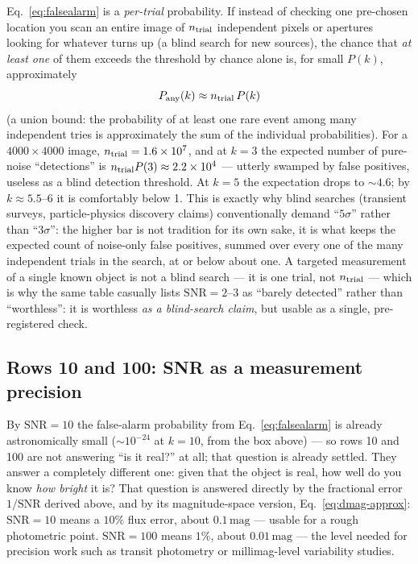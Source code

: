 \documentclass[11pt]{article}
\begin{document}
\begin{tcolorbox}[flagbox, title=THE CATCH: FALSE ALARMS MULTIPLY WITH THE NUMBER OF TRIES]
Eq.~\ref{eq:falsealarm} is a \emph{per-trial} probability. If instead of checking one pre-chosen
location you scan an entire image of $n_{\rm trial}$ independent pixels or apertures looking for
whatever turns up (a blind search for new sources), the chance that \emph{at least one} of them
exceeds the threshold by chance alone is, for small $P(k)$, approximately
\begin{equation}
P_{\rm any}(k) \approx n_{\rm trial}\,P(k)
\end{equation}
(a union bound: the probability of at least one rare event among many independent tries is
approximately the sum of the individual probabilities). For a $4000\times4000$ image,
$n_{\rm trial}=1.6\times10^7$, and at $k=3$ the expected number of pure-noise ``detections'' is
$n_{\rm trial}P(3)\approx 2.2\times10^4$ --- utterly swamped by false positives, useless as a blind
detection threshold. At $k=5$ the expectation drops to $\sim4.6$; by $k\approx5.5$--6 it is comfortably
below 1. This is exactly why blind searches (transient surveys, particle-physics discovery claims)
conventionally demand ``$5\sigma$'' rather than ``$3\sigma$'': the higher bar is not tradition for its
own sake, it is what keeps the expected count of noise-only false positives, summed over every one of
the many independent trials in the search, at or below about one. A targeted measurement of a single
known object is not a blind search --- it is one trial, not $n_{\rm trial}$ --- which is why the same
table casually lists $\mathrm{SNR}=2$--3 as ``barely detected'' rather than ``worthless'': it is
worthless \emph{as a blind-search claim}, but usable as a single, pre-registered check.
\end{tcolorbox}

\subsection*{Rows 10 and 100: SNR as a measurement precision}

By $\mathrm{SNR}=10$ the false-alarm probability from Eq.~\ref{eq:falsealarm} is already
astronomically small ($\sim10^{-24}$ at $k=10$, from the box above) --- so rows 10 and 100 are not
answering ``is it real?'' at all; that question is already settled. They answer a completely different
one: given that the object is real, how well do you know \emph{how bright} it is? That question is
answered directly by the fractional error $1/\mathrm{SNR}$ derived above, and by its magnitude-space
version, Eq.~\ref{eq:dmag-approx}: $\mathrm{SNR}=10$ means a $10\%$ flux error, about
$0.1\,\mathrm{mag}$ --- usable for a rough photometric point. $\mathrm{SNR}=100$ means $1\%$, about
$0.01\,\mathrm{mag}$ --- the level needed for precision work such as transit photometry or
millimag-level variability studies.
\end{document}
